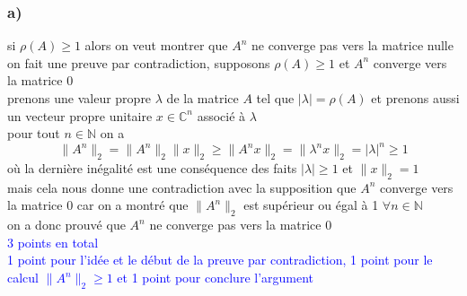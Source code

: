 \documentclass[11pt, a4paper, oneside]{article}
\begin{document}
\subsubsection*{a)}
si $\rho(A) \geq 1$ alors on veut montrer que $A^n$ ne converge pas vers la matrice nulle \\
{\tiny on fait une preuve par contradiction,} supposons $\rho(A) \geq 1$ et $A^n$ converge vers la matrice 0 \\
prenons une valeur propre $\lambda$ de la matrice $A$ tel que $|\lambda| = \rho(A)$ et prenons aussi un vecteur propre unitaire $x \in \mathbb{C}^n$ associé à $\lambda$ \\
pour tout $n \in \mathbb{N}$ on a $$\lVert A^n \rVert_2 = \lVert A^n \rVert_2 \lVert x \rVert_2 \geq \lVert A^nx \rVert_2 = \lVert \lambda^n x \rVert_2 = |\lambda|^n \geq 1$$ {\tiny où la dernière inégalité est une conséquence des faits $|\lambda|\geq 1$ et $\lVert x \rVert_2 = 1$} \\
mais cela nous donne une contradiction avec la supposition que $A^n$ converge vers la matrice 0 car on a montré que $\lVert A^n \rVert_2$ est supérieur ou égal à 1 $\forall n \in \mathbb{N}$ \\
{\tiny on a donc prouvé que $A^n$ ne converge pas vers la matrice 0} \\
\textcolor{blue}{3 points en total \\ 1 point pour l'idée et le début de la preuve par contradiction, 1 point pour le calcul $\lVert A^n \rVert_2 \geq 1$ et 1 point pour conclure l'argument} 
\end{document}
